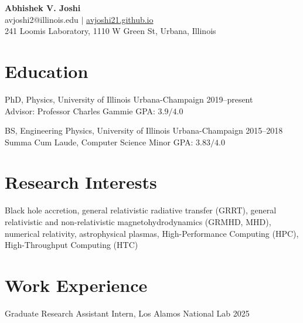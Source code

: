 \documentclass[11pt]{article}
\begin{document}
\begin{center}
{\Large \bfseries Abhishek V. Joshi}\\\vspace{0.5em}
avjoshi2@illinois.edu $|$ \href{https://avjoshi21.github.io}{avjoshi21.github.io} \\\vspace{0.25em} 241 Loomis Laboratory, 1110 W Green St, Urbana, Illinois
\end{center}

\section*{Education}
PhD, Physics, University of Illinois Urbana-Champaign \hfill 2019--present\\
Advisor: Professor Charles Gammie  \hfill {\normalsize GPA: $3.9/4.0$}


BS, Engineering Physics, University of Illinois Urbana-Champaign \hfill 2015--2018\\
{\normalsize Summa Cum Laude, Computer Science Minor} {\hfill GPA: $3.83/4.0$}


\section*{Research Interests}
Black hole accretion, general relativistic radiative transfer (GRRT), general relativistic and non-relativistic magnetohydrodynamics (GRMHD, MHD), numerical relativity, astrophysical plasmas, High-Performance Computing (HPC), High-Throughput Computing (HTC)   

\section*{Work Experience}
Graduate Research Assistant Intern, Los Alamos National Lab \hfill 2025\\
\end{document}
